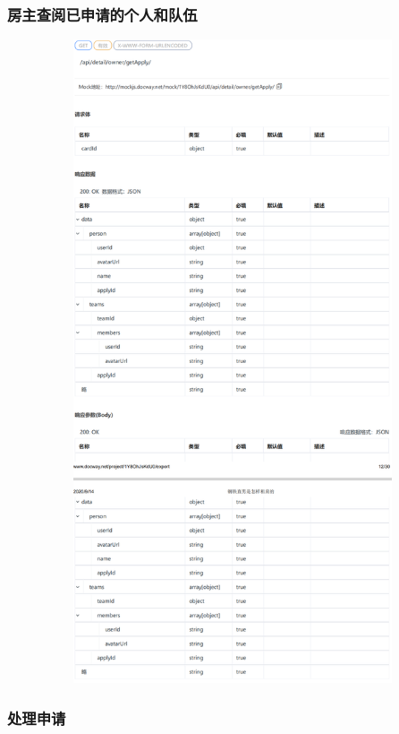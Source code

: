                             \subsubsection{房主查阅已申请的个人和队伍} 
                            \begin{figure}[h]
                                \centering
                                \includegraphics[height=19.0cm,width=14.0cm]{design/image/api12.png} 
                                \end{figure}  
                                \newpage                         \subsubsection{处理申请} 
